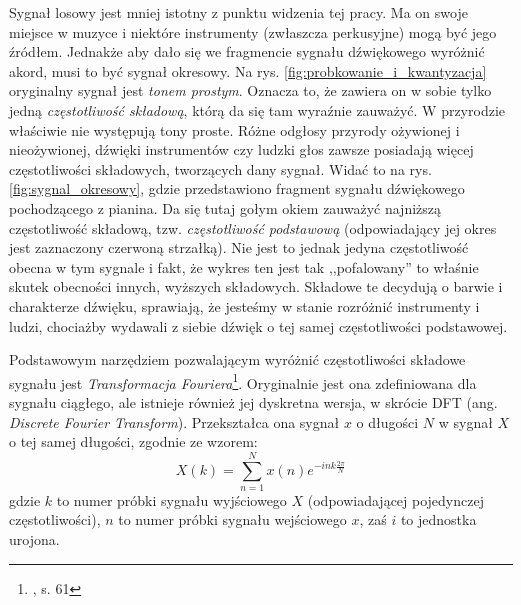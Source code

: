 Sygnał losowy jest mniej istotny z punktu widzenia tej pracy. Ma on swoje miejsce w muzyce i niektóre instrumenty (zwłaszcza perkusyjne) mogą być jego źródłem. Jednakże aby dało się we fragmencie sygnału dźwiękowego wyróżnić akord, musi to być sygnał okresowy. Na rys. \ref{fig:probkowanie_i_kwantyzacja} oryginalny sygnał jest \emph{tonem prostym}. Oznacza to, że zawiera on w sobie tylko jedną \emph{częstotliwość składową}, którą da się tam wyraźnie zauważyć. W przyrodzie właściwie nie występują tony proste. Różne odgłosy przyrody ożywionej i nieożywionej, dźwięki instrumentów czy ludzki głos zawsze posiadają więcej częstotliwości składowych, tworzących dany sygnał. Widać to na rys. \ref{fig:sygnal_okresowy}, gdzie przedstawiono fragment sygnału dźwiękowego pochodzącego z pianina. Da się tutaj gołym okiem zauważyć najniższą częstotliwość składową, tzw. \emph{częstotliwość podstawową} (odpowiadający jej okres jest zaznaczony czerwoną strzałką). Nie jest to jednak jedyna częstotliwość obecna w tym sygnale i fakt, że wykres ten jest tak ,,pofalowany'' to właśnie skutek obecności innych, wyższych składowych. Składowe te decydują o barwie i charakterze dźwięku, sprawiają, że jesteśmy w stanie rozróżnić instrumenty i ludzi, chociażby wydawali z siebie dźwięk o tej samej częstotliwości podstawowej. 

Podstawowym narzędziem pozwalającym wyróżnić częstotliwości składowe sygnału jest \emph{Transformacja Fouriera}\footnote{\cite{lyons_wprowadzenie_2000}, s. 61}. Oryginalnie jest ona zdefiniowana dla sygnału ciągłego, ale istnieje również jej dyskretna wersja, w skrócie DFT (ang. \emph{Discrete Fourier Transform}).  Przekształca ona sygnał $x$ o długości $N$ w sygnał $X$ o tej samej długości, zgodnie ze wzorem:
\begin{equation} \label{eq:dft}
    X(k) = \sum_{n=1}^{N} x(n) e^{-ink \frac{2 \pi}{N}}
\end{equation}
gdzie $k$ to numer próbki sygnału wyjściowego $X$ (odpowiadającej pojedynczej częstotliwości), $n$ to numer próbki sygnału wejściowego $x$, zaś $i$ to jednostka urojona.

